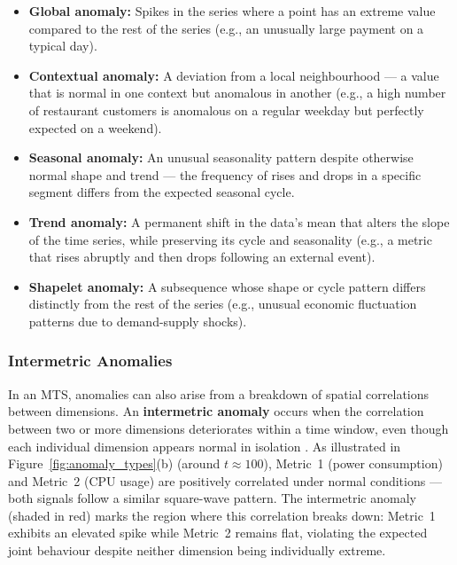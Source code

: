 \documentclass[twoside,11pt,openright]{report}
\begin{document}
\begin{itemize}
 
    \item \textbf{Global anomaly:}
    Spikes in the series where a point has an extreme value compared to the rest of the series (e.g., an unusually large payment on a typical day).
 
    \item \textbf{Contextual anomaly:}
    A deviation from a local neighbourhood --- a value that is normal in one context but anomalous in another 
    (e.g., a high number of restaurant customers is anomalous on a regular weekday but perfectly expected on a weekend).
 
    \item \textbf{Seasonal anomaly:}
    An unusual seasonality pattern despite otherwise normal shape and trend --- the frequency of rises and drops in a specific segment differs from the expected seasonal cycle.
 
    \item \textbf{Trend anomaly:}
    A permanent shift in the data's mean that alters the slope of the time series, while preserving its cycle and seasonality (e.g., a metric that rises abruptly and then drops following an external event).
 
    \item \textbf{Shapelet anomaly:}
    A subsequence whose shape or cycle pattern differs distinctly from the rest of the series (e.g., unusual economic fluctuation patterns due to demand-supply shocks).
 
\end{itemize}
 
\subsubsection{Intermetric Anomalies}

In an MTS, anomalies can also arise from a breakdown of spatial correlations between
dimensions. An \textbf{intermetric anomaly} occurs when the correlation between two or
more dimensions deteriorates within a time window, even though each individual dimension
appears normal in isolation \citep{darban2024survey}. As illustrated in
Figure~\ref{fig:anomaly_types}(b) (around $t \approx 100$), Metric~1 (power consumption)
and Metric~2 (CPU usage) are positively correlated under normal conditions --- both
signals follow a similar square-wave pattern. The intermetric anomaly (shaded in red)
marks the region where this correlation breaks down: Metric~1 exhibits an elevated spike
while Metric~2 remains flat, violating the expected joint behaviour despite neither
dimension being individually extreme.
\end{document}
